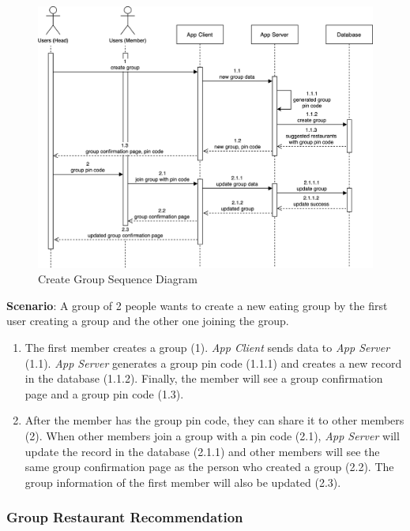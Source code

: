 \documentclass[12pt,oneside,openright,a4paper]{cpe-english-project}
\begin{document}
\begin{figure}[H]\centering
\includegraphics[width=400pt]{./images/3seqdiagram_creategroup.png}
\caption{Create Group Sequence Diagram}\label{fig:3seqdiagram_creategroup}
\end{figure}\vspace{-24pt}

\textbf{Scenario}: A group of 2 people wants to create a new eating group by the first user creating a group and the other one joining the group.
\begin{enumerate}
\item The first member creates a group (1). \textit{App Client} sends data to \textit{App Server} (1.1). \textit{App Server} generates a group pin code (1.1.1) and creates a new record in the database (1.1.2). Finally, the member will see a group confirmation page and a group pin code (1.3).
\item After the member has the group pin code, they can share it to other members (2). When other members join a group with a pin code (2.1), \textit{App Server} will update the record in the database (2.1.1) and other members will see the same group confirmation page as the person who created a group (2.2). The group information of the first member will also be updated (2.3).
\end{enumerate}


\newpage

\subsubsection{Group Restaurant Recommendation}
\end{document}
